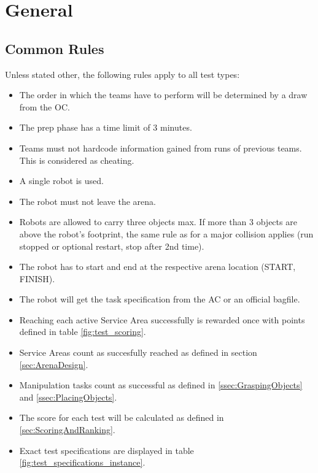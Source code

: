 \label{sec:Tests}

\section{General}

\subsection{Common Rules}
\label{ssec: Common Rules}


Unless stated other, the following rules apply to all test types:

\begin{itemize}
\item The order in which the teams have to perform will be determined by a draw from the OC.
\item The prep phase has a time limit of 3 minutes.
\item Teams must not hardcode information gained from runs of previous teams. This is considered as cheating.
\item A single robot is used.
\item The robot must not leave the arena.
\item Robots are allowed to carry three objects max. If more than 3 objects are above the robot's footprint, the same rule as for a major collision applies (run stopped or optional restart, stop after 2nd time). 
\item The robot has to start and end at the respective arena location (START, FINISH).
\item The robot will get the task specification from the AC or an official bagfile.
\item Reaching each active Service Area successfully is rewarded once with points defined in table \ref{fig:test_scoring}.
\item Service Areas count as succesfully reached as defined in section \ref{sec:ArenaDesign}.
\item Manipulation tasks count as successful as defined in \ref{ssec:GraspingObjects} and \ref{ssec:PlacingObjects}.
\item The score for each test will be calculated as defined in \ref{sec:ScoringAndRanking}.
\item Exact test specifications are displayed in table \ref{fig:test_specifications_instance}.
\end{itemize}





